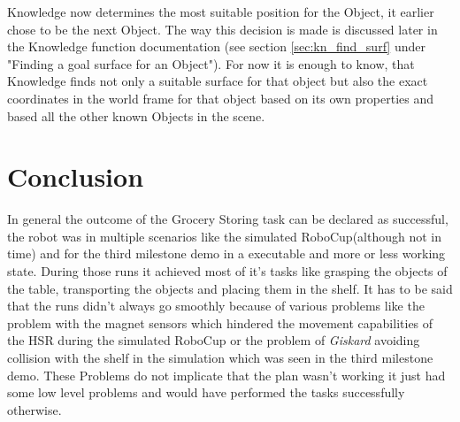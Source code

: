 \documentclass[main.tex]{subfiles}
\begin{document}
Knowledge now determines the most suitable position for the Object, it earlier chose to be the next Object. The way this decision is made is discussed later in the Knowledge function documentation (see section \ref{sec:kn_find_surf} under "Finding a goal surface for an Object"). For now it is enough to know, that Knowledge finds not only a suitable surface for that object but also the exact coordinates in the world frame for that object based on its own properties and based all the other known Objects in the scene.
	
	
	
	
	
	
	
	
	
	
	\section{Conclusion}

	In general the outcome of the Grocery Storing task can be declared as successful, the robot was in multiple scenarios like the simulated RoboCup(although not in time) and for the third milestone demo in a executable and more or less working state. During those runs it achieved most of it's tasks like grasping the objects of the table, transporting the objects and placing them in the shelf.
	It has to be said that the runs didn't always go smoothly because of various problems like the problem with the magnet sensors which hindered the movement capabilities of the HSR during the simulated RoboCup or the problem of \textit{Giskard} avoiding collision with the shelf in the simulation which was seen in the third milestone demo.
	These Problems do not implicate that the plan wasn't working it just had some low level problems and would have performed the tasks successfully otherwise.
	
	
	\endgroup
	
\end{document}
